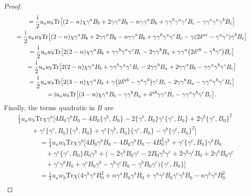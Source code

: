 \documentclass[10pt,a4paper]{amsart}
\numberwithin{equation}{section}
\theoremstyle{definition}
\def\Tr{\mathrm{Tr}}
\begin{document}
\begin{proof}
\begin{gather*}
			\qquad=\frac{\rm i}{2} u_a w_b \Tr \bigl[
			(2-n)\chi\gamma^a B_b +2\gamma \gamma^a B_b -n\gamma \gamma^a B_b +\gamma\gamma^b \gamma^a \gamma^c B_c -\gamma\gamma^c \gamma^a \gamma^b B_c\bigr] \\
			\qquad=\frac{\rm i}{2} u_a w_b \Tr \bigl[
			(2-n) \chi\gamma^a B_b +2\gamma\gamma^a B_b -n \gamma\gamma^a B_b +\gamma\gamma^b \gamma^a\gamma^c B_c -\gamma (2\delta^{ac}-\gamma^a \gamma^c)\gamma^b B_c \bigr] \\
			\qquad=\frac{\rm i}{2}u_a w_b \Tr \bigl[
			2(2-n)\chi\gamma^a B_b +\gamma\gamma^b \gamma^a \gamma^c B_c -2\gamma\gamma^b B_a +\gamma\gamma^a \bigl(2\delta^{cb}-\gamma^b \gamma^c\bigr)B_c
			\bigr] \\
			\qquad=\frac{\rm i}{2} u_a w_b \Tr \bigl[2(2-n)\chi\gamma^a B_b +\gamma\gamma^b \gamma^a \gamma^c B_c -2\gamma\gamma^b B_a +2\gamma\gamma^a B_b -\gamma\gamma^a\gamma^b \gamma^c B_c\bigr] \\
			\qquad=\frac{\rm i}{2}u_a w_b \Tr \bigl[
			2(3-n)\chi\gamma^a B_b +\gamma \bigl(2\delta^{ab}-\gamma^a\gamma^b\bigr)\gamma^c B_c -2\gamma\gamma^b B_a -\gamma \gamma^a\gamma^b \gamma^c B_c\bigr] \\
			\qquad= {\rm i}u_a w_b\Tr \bigl[(3-n)\chi\gamma^a B_b -\gamma\gamma^b B_a +\delta^{ab}\gamma\gamma^c B_c -\gamma\gamma^a \gamma^b \gamma^c B_c\bigr].
		\end{gather*}
 Finally, the terms quadratic in $B$ are
 \begin{gather*}%
			\frac{1}{4}u_aw_b\Tr \chi\gamma^a\bigl[4B_0\gamma^bB_0-4B_0\bigl\{\gamma^b,B_0\bigr\}-2\bigl\{\gamma^b,B_0\bigr\}\gamma^c\{\gamma^c,B_0\}+2\gamma^b\{\gamma^c,B_0\}^2\\
		\qquad+\gamma^c\{\gamma^c,B_0\}\bigl\{\gamma^b,B_0\bigr\}+\gamma
 ^c\bigl\{\gamma^b,B_0\bigr\}\{\gamma^c,B_0\}-\gamma^b\{\gamma^c,B_0\}^2\bigr]\\
		\phantom{\qquad+}{}	=\frac{1}{4}u_aw_b \Tr \chi \gamma^a\bigl[
 4 B_0 \gamma^b B_0 -4 B_0 \gamma^b B_0 -4 B_0^2 \gamma^b +\gamma^c\{\gamma^c, B_0\}\gamma^b B_0\\
\phantom{\qquad+=}{} +\gamma^c\{\gamma^c, B_0\}B_0 \gamma^b	+\bigl(-2\gamma^b B_0 \gamma^c -2B_0 \gamma^b \gamma^c +2\gamma^b \gamma^c B_0 +2\gamma^b B_0 \gamma^c \\
\phantom{\qquad+=}{}	+\gamma^c \gamma^b B_0 +\gamma^c B_0 \gamma^b-\gamma^b\gamma^c B_0 -\gamma^b B_0 \gamma^c\bigr)\{\gamma^c, B_0\}
 \bigr]\\
 \phantom{\qquad+}{}	=\frac{1}{4}u_aw_b \Tr \chi\bigl(4\gamma^b \gamma^a B_0^2 +n\gamma^a B_0 \gamma^b B_0+\gamma^a \gamma^c B_0 \gamma^c \gamma^b B_0 -n\gamma^b \gamma^a B_0^2\\

\end{gather*}
\end{proof}
\end{document}
